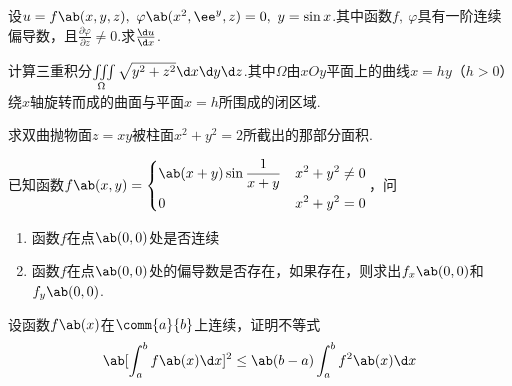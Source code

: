 \begin{exercise}
    设$u=f\ab(x,y,z),\ \varphi\ab(x^2,\ee^y,z)=0,\ y=\sin{x}$.其中函数$f,\ \varphi$具有一阶连续偏导数，且$\frac{\partial\varphi}{\partial z}\neq 0$.求$\frac{\d u}{\d x}$.
\end{exercise}

\begin{exercise}
    计算三重积分$\iiint\limits_{\Omega}{\sqrt{y^2+z^2}}\d x\d y\d z$.其中$\Omega$由$xOy$平面上的曲线$x=hy$（$h>0$）绕$x$轴旋转而成的曲面与平面$x=h$所围成的闭区域.
\end{exercise}

\begin{exercise}
    求双曲抛物面$z=xy$被柱面$x^2+y^2=2$所截出的那部分面积.
\end{exercise}

\begin{exercise}
    已知函数$f\ab(x,y)=
    \left\{
        \begin{aligned}
            &\ab(x+y)\sin{\frac{1}{x+y}}&&x^2+y^2\neq 0\\
            &0&&x^2+y^2=0
        \end{aligned}
    \right.
    $，问
    \vspace{1em}
    \begin{enumerate}
        \item 函数$f$在点$\ab(0,0)$处是否连续
        \item 函数$f$在点$\ab(0,0)$处的偏导数是否存在，如果存在，则求出$f_x\ab(0,0)$和$f_y\ab(0,0)$.
    \end{enumerate}
\end{exercise}

\begin{exercise}
    设函数$f\ab(x)$在$\comm{a}{b}$上连续，证明不等式
    $$\ab[\int_a^b{f\ab(x)\d x}]^2\le\ab(b-a)\int_a^b{f^2\ab(x)\d x}$$
\end{exercise}